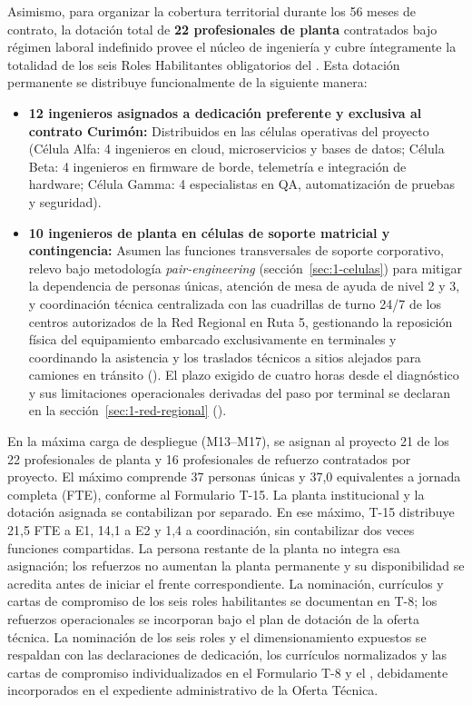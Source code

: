 \noindent Asimismo, para organizar la cobertura territorial durante los 56 meses de contrato, la dotación total de \textbf{22 profesionales de planta} contratados bajo régimen laboral indefinido provee el núcleo de ingeniería y cubre íntegramente la totalidad de los seis Roles Habilitantes obligatorios del . Esta dotación permanente se distribuye funcionalmente de la siguiente manera:
\begin{itemize}
  \item \textbf{12 ingenieros asignados a dedicación preferente y exclusiva al contrato Curimón:} Distribuidos en las células operativas del proyecto (Célula Alfa: 4 ingenieros en cloud, microservicios y bases de datos; Célula Beta: 4 ingenieros en firmware de borde, telemetría e integración de hardware; Célula Gamma: 4 especialistas en QA, automatización de pruebas y seguridad).
  \item \textbf{10 ingenieros de planta en células de soporte matricial y contingencia:} Asumen las funciones transversales de soporte corporativo, relevo bajo metodología \textit{pair-engineering} (sección~\ref{sec:1-celulas}) para mitigar la dependencia de personas únicas, atención de mesa de ayuda de nivel 2 y 3, y coordinación técnica centralizada con las cuadrillas de turno 24/7 de los centros autorizados de la Red Regional en Ruta 5, gestionando la reposición física del equipamiento embarcado exclusivamente en terminales y coordinando la asistencia y los traslados técnicos a sitios alejados para camiones en tránsito (). El plazo exigido de cuatro horas desde el diagnóstico y sus limitaciones operacionales derivadas del paso por terminal se declaran en la sección~\ref{sec:1-red-regional} ().
\end{itemize}
En la máxima carga de despliegue (M13--M17), se asignan al proyecto 21 de los 22 profesionales de planta y 16 profesionales de refuerzo contratados por proyecto. El máximo comprende 37 personas únicas y 37,0 equivalentes a jornada completa (FTE), conforme al Formulario T-15. La planta institucional y la dotación asignada se contabilizan por separado. En ese máximo, T-15 distribuye 21,5 FTE a E1, 14,1 a E2 y 1,4 a coordinación, sin contabilizar dos veces funciones compartidas. La persona restante de la planta no integra esa asignación; los refuerzos no aumentan la planta permanente y su disponibilidad se acredita antes de iniciar el frente correspondiente. La nominación, currículos y cartas de compromiso de los seis roles habilitantes se documentan en T-8; los refuerzos operacionales se incorporan bajo el plan de dotación de la oferta técnica.
La nominación de los seis roles y el dimensionamiento expuestos se respaldan con las declaraciones de dedicación, los currículos normalizados y las cartas de compromiso individualizados en el Formulario T-8 y el , debidamente incorporados en el expediente administrativo de la Oferta Técnica.

